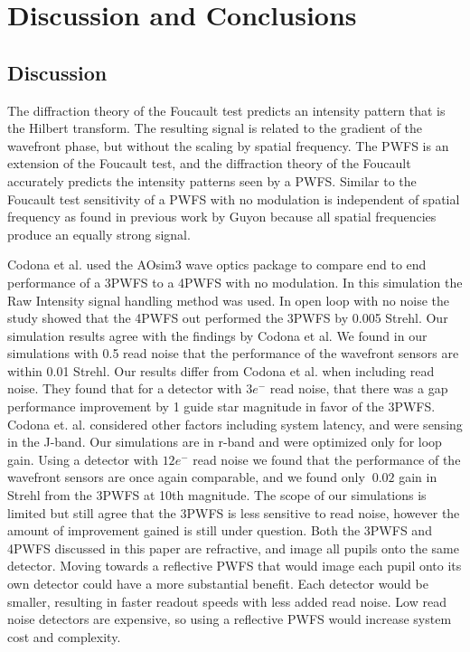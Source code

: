 \chapter{Discussion and Conclusions}\label{CH6}

\section{Discussion}

The diffraction theory of the Foucault test predicts an intensity pattern that is the Hilbert transform. The resulting signal is related to the gradient of the wavefront phase, but without the scaling by spatial frequency. The PWFS is an extension of the Foucault test, and the diffraction theory of the Foucault accurately predicts the intensity patterns seen by a PWFS. Similar to the Foucault test sensitivity of a PWFS with no modulation is independent of spatial frequency as found in previous work by Guyon\cite{guyon2005} because all spatial frequencies produce an equally strong signal.

 Codona et al.\cite{codona2018comparative} used the AOsim3 wave optics package to compare end to end performance of a 3PWFS to a 4PWFS with no modulation. In this simulation the Raw Intensity  signal handling method was used. In open loop with no noise the study showed that the 4PWFS out performed the 3PWFS by 0.005 Strehl. Our simulation results agree with the findings by Codona et al. We found in our simulations with 0.5 read noise that the performance of the wavefront sensors are within 0.01 Strehl. Our results differ from Codona et al. when including read noise. They found that for a detector with $3e^-$ read noise, that there was a gap performance improvement by 1 guide star magnitude in favor of the 3PWFS. Codona et. al. considered other factors including system latency, and were sensing in the J-band. Our simulations are in r-band and were optimized only for loop gain. Using a detector with $12 e^-$ read noise we found that the performance of the wavefront sensors are once again comparable, and we found only $~0.02$ gain in Strehl from the 3PWFS at 10th magnitude. The scope of our simulations is limited but still agree that the 3PWFS is less sensitive to read noise, however the amount of improvement gained is still under question. Both the 3PWFS and 4PWFS discussed in this paper are refractive, and image all pupils onto the same detector. Moving towards a reflective PWFS that would image each pupil onto its own detector could have a more substantial benefit. Each detector would be smaller, resulting in faster readout speeds with less added read noise. Low read noise detectors are expensive, so using a reflective PWFS would increase system cost and complexity.   
 
